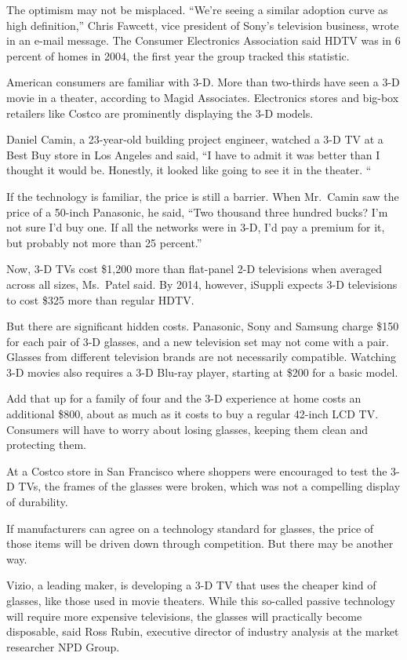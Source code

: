 ﻿\documentclass[12pt]{article}
\begin{document}
The optimism may not be misplaced. ``We're seeing a similar adoption curve as high definition,''
Chris Fawcett, vice president of Sony's television business, wrote in an e-mail message. The
Consumer Electronics Association said HDTV was in 6 percent of homes in 2004, the first year the
group tracked this statistic.

American consumers are familiar with 3-D. More than two-thirds have seen a 3-D movie in a theater,
according to Magid Associates. Electronics stores and big-box retailers like Costco are prominently
displaying the 3-D models.

Daniel Camin, a 23-year-old building project engineer, watched a 3-D TV at a Best Buy store in Los
Angeles and said, ``I have to admit it was better than I thought it would be. Honestly, it looked
like going to see it in the theater. ``

If the technology is familiar, the price is still a barrier. When Mr.~Camin saw the price of a
50-inch Panasonic, he said, ``Two thousand three hundred bucks? I'm not sure I'd buy one. If all the
networks were in 3-D, I'd pay a premium for it, but probably not more than 25 percent.''

Now, 3-D TVs cost \$1,200 more than flat-panel 2-D televisions when averaged across all sizes,
Ms.~Patel said. By 2014, however, iSuppli expects 3-D televisions to cost \$325 more than regular
HDTV.

But there are significant hidden costs. Panasonic, Sony and Samsung charge \$150 for each pair of
3-D glasses, and a new television set may not come with a pair. Glasses from different television
brands are not necessarily compatible. Watching 3-D movies also requires a 3-D Blu-ray player,
starting at \$200 for a basic model.

Add that up for a family of four and the 3-D experience at home costs an additional \$800, about as
much as it costs to buy a regular 42-inch LCD TV. Consumers will have to worry about losing glasses,
keeping them clean and protecting them.

At a Costco store in San Francisco where shoppers were encouraged to test the 3-D TVs, the frames of
the glasses were broken, which was not a compelling display of durability.

If manufacturers can agree on a technology standard for glasses, the price of those items will be
driven down through competition. But there may be another way.

Vizio, a leading maker, is developing a 3-D TV that uses the cheaper kind of glasses, like those
used in movie theaters. While this so-called passive technology will require more expensive
televisions, the glasses will practically become disposable, said Ross Rubin, executive director of
industry analysis at the market researcher NPD Group.
\end{document}
